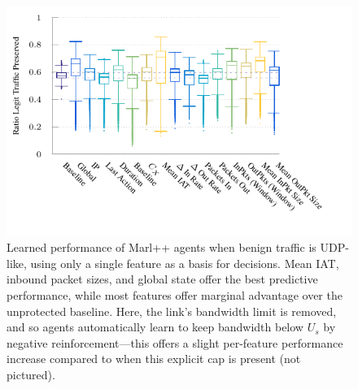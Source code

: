 \documentclass[conference, letterpaper, 10pt, times]{IEEEtran}
\begin{document}
\begin{figure}
	\centering
	\includegraphics[width=\linewidth]{../plots/ftprep-box}
	\vspace{-1.2cm}
	\caption{
		Learned performance of Marl++ agents when benign traffic is UDP-like, using only a single feature as a basis for decisions.
		Mean IAT, inbound packet sizes, and global state offer the best predictive performance, while most features offer marginal advantage over the unprotected baseline.
		Here, the link's bandwidth limit is removed, and so agents automatically learn to keep bandwidth below $U_s$ by negative reinforcement---this offers a slight per-feature performance increase compared to when this explicit cap is present (not pictured).
		\label{fig:udp-feature-plots}
	}
\end{figure}
\end{document}
